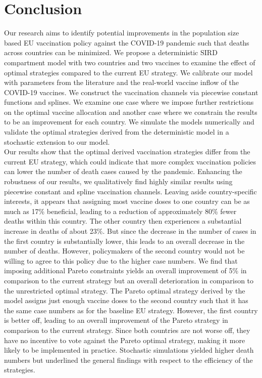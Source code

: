 \section{Conclusion}
Our research aims to identify potential improvements in the population size based EU vaccination policy against the COVID-19 pandemic such that deaths across countries can be minimized. We propose a deterministic SIRD compartment model with two countries and two vaccines to examine the effect of optimal strategies compared to the current EU strategy. We calibrate our model with parameters from the literature and the real-world vaccine inflow of the COVID-19 vaccines. We construct the vaccination channels via piecewise constant functions and splines. We examine one case where we impose further restrictions on the optimal vaccine allocation and another case where we constrain the results to be an improvement for each country. We simulate the models numerically and validate the optimal strategies derived from the deterministic model in a stochastic extension to our model.\\

Our results show that the optimal derived vaccination strategies differ from the current EU strategy, which could indicate that more complex vaccination policies can lower the number of death cases caused by the pandemic. Enhancing the robustness of our results, we qualitatively find highly similar results using piecewise constant and spline vaccination channels. Leaving aside country-specific interests, it appears that assigning most vaccine doses to one country can be as much as 17\% beneficial, leading to a reduction of approximately 80\% fewer deaths within this country. The other country then experiences a substantial increase in deaths of about 23\%. But since the decrease in the number of cases in the first country is substantially lower, this leads to an overall decrease in the number of deaths. However, policymakers of the second country would not be willing to agree to this policy due to the higher case numbers. We find that imposing additional Pareto constraints yields an overall improvement of 5\% in comparison to the current strategy but an overall deterioration in comparison to the unrestricted optimal strategy. The Pareto optimal strategy derived by the model assigns just enough vaccine doses to the second country such that it has the same case numbers as for the baseline EU strategy. However, the first country is better off, leading to an overall improvement of the Pareto strategy in comparison to the current strategy. Since both countries are not worse off, they have no incentive to vote against the Pareto optimal strategy, making it more likely to be implemented in practice. Stochastic simulations yielded higher death numbers but underlined the general findings with respect to the efficiency of the strategies.

